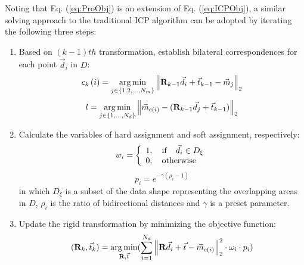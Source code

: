 \documentclass[review]{elsarticle}
\begin{document}
Noting that Eq. (\ref{eq:ProObj}) is an extension of Eq. (\ref{eq:ICPObj}), a similar solving approach to the traditional ICP algorithm can be adopted by iterating the following three steps:
\begin{enumerate}[(1)]
\item Based on $\left( {k - 1} \right)th$ transformation, establish bilateral correspondences for each point ${\vec d _i}$ in $D$:
\begin{equation}
{{c_k}\left( i \right) = \mathop {\arg \min }\limits_{j \in \left\{ {1,2, \ldots ,{N_m}} \right\}} {\left\| {{{\bf{R}}_{k - 1}}{{\vec d }_i} + {{\vec t }_{k - 1}} - {{\vec m }_j}} \right\|_2}}
\label{eq:ProBiCorrj}
\end{equation}
\begin{equation}
{l = \mathop {\arg \min }\limits_{j \in \{ 1,...,{N_d}\} } {\left\| {{{\vec m }_{c(i)}} - ({{\bf{R}}_{k - 1}}{{\vec d }_j} + {{\vec t }_{k - 1}})} \right\|_2}}
\label{eq:ProBiCorrl}
\end{equation}

\item Calculate the variables of hard assignment and soft assignment, respectively:
\begin{equation}
{{w_i} = \left\{ \begin{array}{l}
1,{\rm{\quad if \quad}}{\vec d _i} \in {D_\xi }\\
0,{\rm{\quad otherwise}}
\end{array} \right.}
\label{eq:hardass}
\end{equation}
\begin{equation}
{{p_i} = {e^{ - \gamma ({\rho _i} - 1)}}}
\label{eq:softass}
\end{equation}
in which ${D_\xi }$ is a subset of the data shape representing the overlapping areas in $D$, ${\rho _i}$ is the ratio of bidirectional distances and $\gamma $ is a preset parameter.

\item Update the rigid transformation by minimizing the objective function:
\begin{equation}
{({{\bf{R}}_k},{\vec t _k}) = \mathop {\arg \min }\limits_{{\bf{R}},\vec t } (\sum\limits_{i = 1}^{{N_d}} {\left\| {{\bf{R}}{{\vec d }_i} + \vec t  - {{\vec m }_{c\left( i \right)}}} \right\|} _2^2 \cdot {\omega _i} \cdot {p_i})}
\label{eq:ProTrans}
\end{equation}

\end{enumerate}
\end{document}
